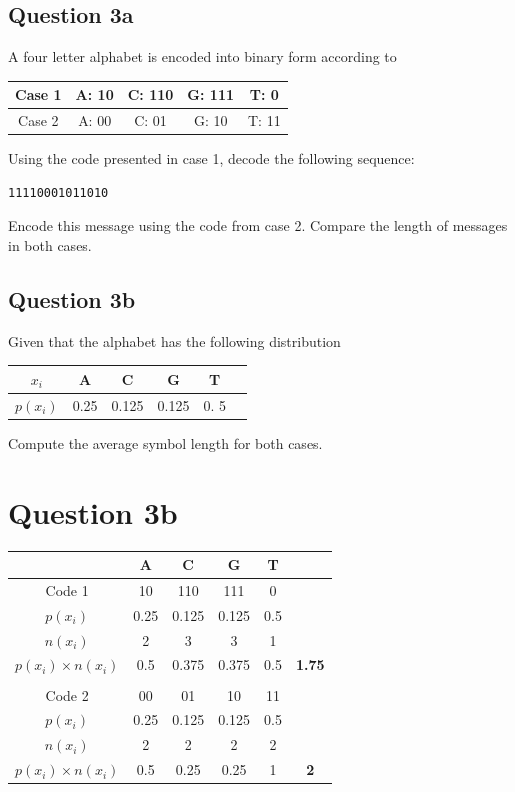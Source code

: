 \documentclass[a4paper,12pt]{article}
\begin{document}
\subsection*{Question 3a}
A four letter alphabet is encoded into binary form according to
\begin{center}
\begin{tabular}{|c|c|c|c|c|}
\hline Case 1	&	A:  10 	&	C:  110	&	G:  111 &	T:  0  \\ \hline
Case 2	&	A:  00	&	C:  01	&		G: 10	&	T: 11	\\ \hline
\end{tabular} 
\end{center}
Using the code presented in case 1, decode the following sequence:
\begin{verbatim}	
11110001011010
\end{verbatim}

\noindent Encode this message using the code from case 2. Compare the length of messages in both cases.

\subsection*{Question 3b}
Given that the alphabet has the following distribution 
\begin{center}
\begin{tabular}{|c|c|c|c|c|c|}
\hline
$x_i$	& A	& C	& G	& T \\ \hline
$p(x_i)$	& 0.25	& 0.125	& 0.125	& 0. 5 \\ \hline
\end{tabular} 
\end{center}
Compute the average symbol length for both cases.



\section*{Question 3b}
\begin{center}
\begin{tabular}{|c|c|c|c|c|c|}
\hline 
	&	A	&	C	&	G	&	T	&		\\ \hline	
Code 1	&	10	&	110	&	111	&	0	&		\\ \hline	
$p(x_i)$	&	0.25	&	0.125	&	0.125	&	0.5	&		\\ \hline	
$n(x_i)$	&	2	&	3	&	3	&	1	&		\\ \hline	
$p(x_i) \times n(x_i)$	&	0.5	&	0.375	&	0.375	&	0.5	&	\textbf{1.75}	\\ \hline	
	&		&		&		&		&		\\ \hline	\hline
Code 2	&	00	&	01	&	10	&	11	&		\\ \hline	
$p(x_i)$	&	0.25	&	0.125	&	0.125	&	0.5	&		\\ \hline	
$n(x_i)$	&	2	&	2	&	2	&	2	&		\\ \hline	
$p(x_i) \times n(x_i)$	&	0.5	&	0.25	&	0.25	&	1	&	\textbf{2}	\\ \hline	
\end{tabular} 
\end{center}
\end{document}

